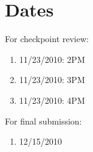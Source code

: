 \documentclass{article}
\begin{document}


\section{Dates} %
\label{sub:dates}

For checkpoint review:

\begin{enumerate}
  \item 11/23/2010: 2PM
  \item 11/23/2010: 3PM
  \item 11/23/2010: 4PM
\end{enumerate}

\noindent For final submission:

\begin{enumerate}
  \item 12/15/2010
\end{enumerate}

\end{document}
